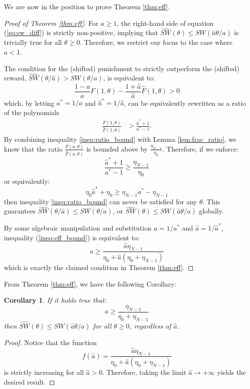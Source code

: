 \documentclass{article}
\newtheorem{corollary}{Corollary}
\begin{document}
We are now in the position to prove Theorem \ref{thm:eff}.
\begin{proof}[Proof of Theorem \ref{thm:eff}]

For $a \ge 1$, the right-hand side of equation (\ref{eq:sw_diff}) is strictly non-positive, implying that $\widehat{SW}(\theta) \le SW(\hat{a}\theta/a)$ is trivially true for all $\theta\ge 0$. Therefore, we restrict our focus to the case where $a < 1$. 

The condition for the (shifted) punishment to strictly outperform the (shifted) reward, $\widehat{SW}(\theta/\hat{a}) > SW(\theta/a)$, is equivalent to:
\begin{equation}
    \frac{1-a}{a}F(1,\theta) - \frac{1+\hat{a}}{\hat{a}}\hat{F}(1,\theta) > 0 \label{ineq:comprp}
\end{equation}
which, by letting $a^* = 1/a$ and $\hat{a}^* = 1/\hat{a}$, can be equivalently rewritten as a ratio of the polynomials
\begin{align}
    \frac{F(1, \theta)}{\hat{F}(1, \theta)} &> \frac{\hat{a}^* +1}{a^* - 1} \label{ineq:ratio_bound}.
\end{align}
By combining inequality \eqref{ineq:ratio_bound} with Lemma \ref{lem:frac_ratio}, we know that the ratio $\frac{F(a, \theta)}{\hat{F}(a, \theta)}$ is bounded above by $\frac{\eta_{N-1}}{\eta_0}$. Therefore, if we enforce:
\[
\frac{\hat{a}^*+1}{a^*-1} \ge \frac{\eta_{N-1}}{\eta_0}
\]
or equivalently:
\begin{equation}
    \eta_0 \hat{a}^* + \eta_0  \ge \eta_{N-1}a^* - \eta_{N-1}
    \label{ineq:eff_bound}
\end{equation}
then inequality \eqref{ineq:ratio_bound} can never be satisfied for any $\theta$. This guarantees $\widehat{SW}(\theta/\hat{a}) \le SW(\theta/a)$, or $\widehat{SW}(\theta) \le SW(\hat{a}\theta/a)$ globally. 

By some algebraic manipulation and substitution $a = 1/a^*$ and $\hat{a} = 1/\hat{a}^*$, inequality (\ref{ineq:eff_bound}) is equivalent to:
\[
a \ge \frac{\hat{a} \eta_{N-1}}{\eta_0 + \hat{a}(\eta_0 + \eta_{N-1})}
\]
which is exactly the claimed condition in Theorem \ref{thm:eff}.
\end{proof}
From Theorem \ref{thm:eff}, we have the following Corollary:

\begin{corollary} \label{col:thm3infb}
If it holds true that:
\[
a \ge \frac{\eta_{N-1}}{\eta_0 + \eta_{N-1}}
\]
then $\widehat{SW}(\theta) \le SW(\hat{a}\theta/a)$ for all $\theta \ge 0$, regardless of $\hat{a}$.
\end{corollary}
\begin{proof}
Notice that the function
\[
f(\hat{a}) = \frac{\hat{a} \eta_{N-1}}{\eta_0 + \hat{a}(\eta_0 + \eta_{N-1})} 
\]
is strictly increasing for all $\hat{a} > 0$. Therefore, taking the limit $\hat{a} \to +\infty$ yields the desired result.
\end{proof}
\end{document}
